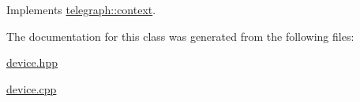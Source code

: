 Implements \hyperlink{classtelegraph_1_1context_a1f600d6159df21dd2750b1c706ca3412}{telegraph\+::context}.



The documentation for this class was generated from the following files\+:\begin{DoxyCompactItemize}
\item 
\hyperlink{device_8hpp}{device.\+hpp}\item 
\hyperlink{device_8cpp}{device.\+cpp}\end{DoxyCompactItemize}

